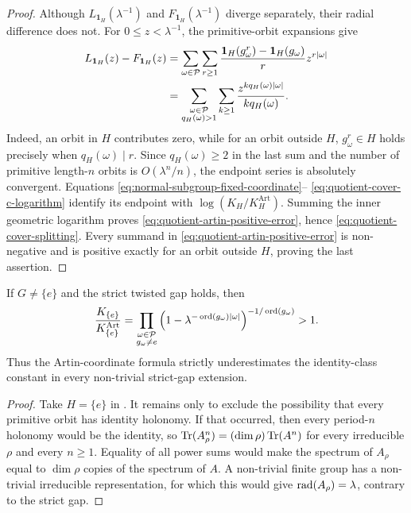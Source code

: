 \begin{proof}
Although \(L_{\mathbf1_H}(\lambda^{-1})\) and
\(F_{\mathbf1_H}(\lambda^{-1})\) diverge separately, their radial difference
does not.  For \(0\le z<\lambda^{-1}\), the primitive-orbit expansions give
\begin{align}
 L_{\mathbf1_H}(z)-F_{\mathbf1_H}(z)
 &=\sum_{\omega\in\mathcal P}\sum_{r\ge1}
   \frac{\mathbf1_H(g_\omega^r)-\mathbf1_H(g_\omega)}{r}
   z^{r|\omega|} \notag\\
 &=\sum_{\substack{\omega\in\mathcal P\\q_H(\omega)>1}}
   \sum_{k\ge1}\frac{z^{kq_H(\omega)|\omega|}}
                       {kq_H(\omega)}.
 \label{eq:quotient-radial-difference}
\end{align}
Indeed, an orbit in \(H\) contributes zero, while for an orbit outside
\(H\), \(g_\omega^r\in H\) holds precisely when \(q_H(\omega)\mid r\).
Since \(q_H(\omega)\ge2\) in the last sum and the number of primitive
length-\(n\) orbits is \(O(\lambda^n/n)\), the endpoint series is absolutely
convergent.  Equations
\eqref{eq:normal-subgroup-fixed-coordinate}--
\eqref{eq:quotient-cover-c-logarithm} identify its endpoint with
\(\log(K_H/K_H^{\mathrm{Art}})\).  Summing the inner geometric logarithm
proves \eqref{eq:quotient-artin-positive-error}, hence
\eqref{eq:quotient-cover-splitting}.  Every summand in
\eqref{eq:quotient-artin-positive-error} is non-negative and is positive
exactly for an orbit outside \(H\), proving the last assertion.
\end{proof}

\begin{corollary}
\label{cor:universal-identity-artin-failure}
If \(G\ne\{e\}\) and the strict twisted gap holds, then
\begin{equation}\label{eq:identity-class-universal-error}
 \frac{K_{\{e\}}}{K_{\{e\}}^{\mathrm{Art}}}
 =\prod_{\substack{\omega\in\mathcal P\\g_\omega\ne e}}
   \left(1-\lambda^{-\operatorname{ord}(g_\omega)|\omega|}\right)^{
      -1/\operatorname{ord}(g_\omega)}>1.
\end{equation}
Thus the Artin-coordinate formula strictly underestimates the identity-class
constant in every non-trivial strict-gap extension.
\end{corollary}

\begin{proof}
Take \(H=\{e\}\) in .  It remains only to
exclude the possibility that every primitive orbit has identity holonomy.
If that occurred, then every period-\(n\) holonomy would be the identity, so
\(\operatorname{Tr}(A_\rho^n)=(\dim\rho)\operatorname{Tr}(A^n)\) for every irreducible \(\rho\) and every
\(n\ge1\).  Equality of all power sums would make the spectrum of \(A_\rho\)
equal to \(\dim\rho\) copies of the spectrum of \(A\).  A non-trivial finite
group has a non-trivial irreducible representation, for which this would give
\(\operatorname{rad}(A_\rho)=\lambda\), contrary to the strict gap.
\end{proof}

